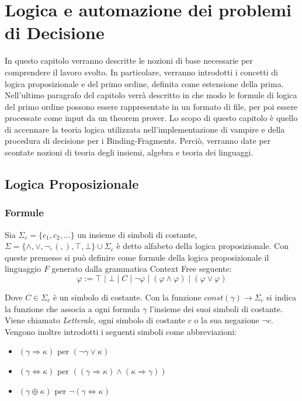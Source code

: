 \documentclass[./main.tex]{subfiles}
\begin{document}
\chapter{Logica e automazione dei problemi di Decisione}

In questo capitolo verranno descritte le nozioni di base necessarie 
per comprendere il lavoro svolto. 
In particolare, verranno introdotti i concetti di logica proposizionale e 
del primo ordine, definita come estensione della prima. Nell'ultimo paragrafo del capitolo 
verrà descritto in che modo le formule di logica del 
primo ordine possono essere rappresentate in un formato di file, per poi essere 
processate come input da un theorem prover. 
Lo scopo di questo capitolo è quello di accennare la teoria logica utilizzata nell'implementazione di vampire 
e della procedura di decisione per i Binding-Fragments. Perciò, verranno date per scontate nozioni di teoria degli insiemi,
algebra e teoria dei linguaggi.



\section{Logica Proposizionale}

\subsection{Formule}
Sia $\Sigma_c = \{c_1, c_2, ...\}$ un insieme di simboli di costante, 
$\Sigma = \{ \land, \lor, \lnot, (, ), \top, \bot\} \cup \Sigma_c$ è detto alfabeto della logica proposizionale. 
Con queste premesse si può definire come formule della logica proposizionale il linguaggio $F$ generato dalla
grammatica Context Free seguente:
$$
\varphi  := \top \mid \bot \mid C \mid \lnot \varphi \mid (\varphi \land \varphi) \mid (\varphi \lor \varphi)
$$

Dove $C \in \Sigma_c$ è un simbolo di costante. Con la funzione $const(\gamma) \rightarrow \Sigma_c$ si indica la funzione che
associa a ogni formula $\gamma$ l'insieme dei suoi simboli di costante. 
Viene chiamato \textit{Letterale}, ogni simbolo di costante $c$ o la sua negazione $\lnot c$.
Vengono inoltre introdotti i seguenti simboli come abbreviazioni:

\begin{itemize}
    \item $(\gamma \Rightarrow \kappa)$ per $(\lnot \gamma \lor \kappa)$
    \item $(\gamma \Leftrightarrow \kappa)$ per $((\gamma \Rightarrow \kappa) \land (\kappa \Rightarrow \gamma))$
    \item $(\gamma \oplus \kappa)$ per $\lnot(\gamma \Leftrightarrow \kappa)$
\end{itemize}
\end{document}
